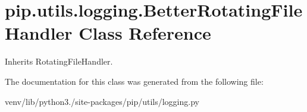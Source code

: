 \hypertarget{classpip_1_1utils_1_1logging_1_1_better_rotating_file_handler}{}\section{pip.\+utils.\+logging.\+Better\+Rotating\+File\+Handler Class Reference}
\label{classpip_1_1utils_1_1logging_1_1_better_rotating_file_handler}


Inherits Rotating\+File\+Handler.



The documentation for this class was generated from the following file\+:\begin{DoxyCompactItemize}
\item 
venv/lib/python3./site-\/packages/pip/utils/logging.\+py\end{DoxyCompactItemize}

